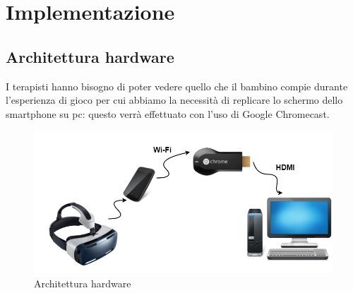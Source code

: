 \section{Implementazione} \label{sec:tecn}

\subsection{Architettura hardware} \label{subsec:hard}
I terapisti hanno bisogno di poter vedere quello che il bambino compie durante l'esperienza di gioco per cui abbiamo la necessità di replicare lo schermo dello smartphone su pc: questo verrà effettuato con l'uso di Google Chromecast.
\vspace{70pt}
\begin{figure}[htbp]
\centering
\includegraphics[width=\textwidth]{Images/hardware}
\caption{Architettura hardware}
\label{fig:hardware}
\end{figure}
\clearpage

